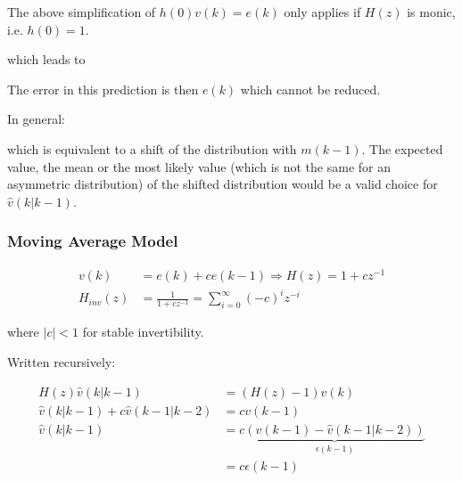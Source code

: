 \documentclass[10pt,a4paper]{scrartcl}
\begin{document}
\begin{multicols*}{2}
The above simplification of $h(0)v(k) = e(k)$ only applies if $H(z)$ is monic, i.e. $h(0) = 1$.


which leads to


The error in this prediction is then $e(k)$ which cannot be reduced.

\vspace{3ex}

In general:



which is equivalent to a shift of the distribution with $m(k-1)$. The expected value, the mean or the most likely value (which is not the same for an asymmetric distribution) of the shifted distribution would be a valid choice for $\hat{v}(k|k-1)$.


\subsubsection{Moving Average Model}

\begin{align*}
v(k)&=e(k)+ce(k-1)\Rightarrow H(z) = 1+cz^{-1}\\
H_{inv}(z) &=\frac{1}{1+cz^{-1}}=\sum\limits_{i=0}^\infty (-c)^iz^{-i}
\end{align*}

where $|c|<1$ for stable invertibility.


Written recursively:

\begin{align*}
H(z)\hat{v}(k|k-1)&=(H(z)-1)v(k)\\
\hat{v}(k|k-1)+c\hat{v}(k-1|k-2)&=cv(k-1)\\
\hat{v}(k|k-1)&=c\underbrace{(v(k-1)-\hat{v}(k-1|k-2))}_{\epsilon(k-1)}\\
&=c\epsilon(k-1)
\end{align*}


\end{multicols*}
\end{document}
